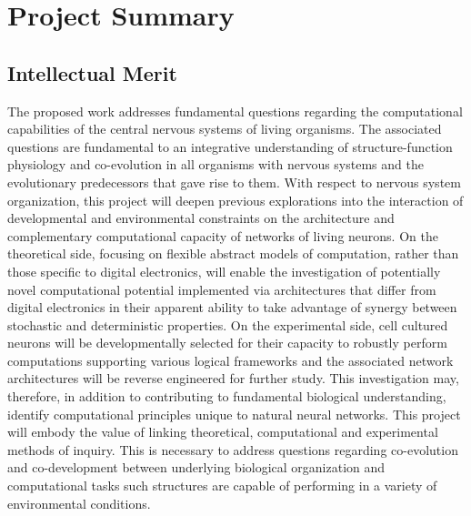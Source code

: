 \section{Project Summary}
\subsection{Intellectual Merit}
\noindent The proposed work addresses fundamental questions regarding the computational capabilities of the central nervous systems of living organisms. The associated questions are fundamental to an integrative understanding of structure-function physiology and co-evolution in all organisms with nervous systems and the evolutionary predecessors that gave rise to them. With respect to nervous system organization, this project will deepen previous explorations into the interaction of developmental and environmental constraints on the architecture and complementary computational capacity of networks of living neurons. On the theoretical side, focusing on flexible abstract models of computation, rather than those specific to digital electronics, will enable the investigation of potentially novel computational potential implemented via architectures that differ from digital electronics in their apparent ability to take advantage of synergy between stochastic and deterministic properties. On the experimental side, cell cultured neurons will be developmentally selected for their capacity to robustly perform computations supporting various logical frameworks and the associated network architectures will be reverse engineered for further study. This investigation may, therefore, in addition to contributing to fundamental biological understanding, identify computational principles unique to natural neural networks. This project will embody the value of linking theoretical, computational and experimental methods of inquiry. This is necessary to address questions regarding co-evolution and co-development between underlying biological organization and computational tasks such structures are capable of performing in a variety of environmental conditions.
